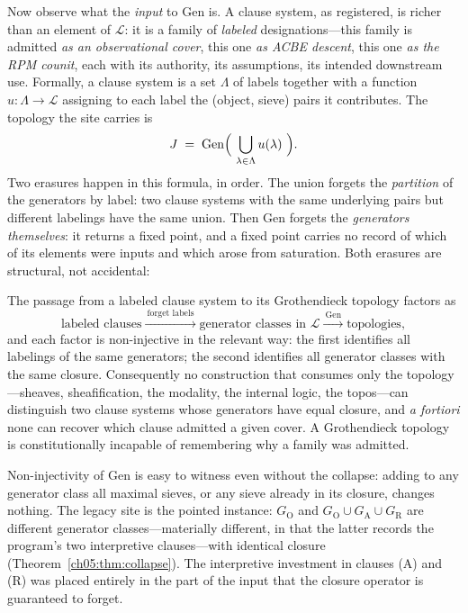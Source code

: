 Now observe what the \emph{input} to $\mathrm{Gen}$ is. A clause system, as
registered, is richer than an element of $\mathcal{L}$: it is a family of
\emph{labeled} designations---this family is admitted \emph{as an
observational cover}, this one \emph{as ACBE descent}, this one \emph{as the
RPM counit}, each with its authority, its assumptions, its intended
downstream use. Formally, a clause system is a set $\Lambda$ of labels
together with a function $u:\Lambda\to\mathcal{L}$ assigning to each label
the (object, sieve) pairs it contributes. The topology the site carries is
\[
J \;=\; \mathrm{Gen}\Bigl(\ \bigcup_{\lambda\in\Lambda}u(\lambda)\ \Bigr).
\]
Two erasures happen in this formula, in order. The union forgets the
\emph{partition} of the generators by label: two clause systems with the same
underlying pairs but different labelings have the same union. Then
$\mathrm{Gen}$ forgets the \emph{generators themselves}: it returns a fixed
point, and a fixed point carries no record of which of its elements were
inputs and which arose from saturation. Both erasures are structural, not
accidental:

\begin{finding}\label{ch05:fnd:erasure}
The passage from a labeled clause system to its Grothendieck topology
factors as
\[
\text{labeled clauses}
\xrightarrow{\ \text{forget labels}\ }
\text{generator classes in }\mathcal{L}
\xrightarrow{\ \mathrm{Gen}\ }
\text{topologies},
\]
and each factor is non-injective in the relevant way: the first identifies
all labelings of the same generators; the second identifies all generator
classes with the same closure. Consequently no construction that consumes
only the topology---sheaves, sheafification, the modality, the internal
logic, the topos---can distinguish two clause systems whose generators have
equal closure, and \emph{a fortiori} none can recover which clause admitted
a given cover. A Grothendieck topology is constitutionally incapable of
remembering why a family was admitted.
\end{finding}

\begin{example}\label{ch05:ex:noninjective}
Non-injectivity of $\mathrm{Gen}$ is easy to witness even without the
collapse: adding to any generator class all maximal sieves, or any sieve
already in its closure, changes nothing. The legacy site is the pointed
instance: $G_{\mathrm{O}}$ and
$G_{\mathrm{O}}\cup G_{\mathrm{A}}\cup G_{\mathrm{R}}$ are different
generator classes---materially different, in that the latter records the
program's two interpretive clauses---with identical closure
(Theorem~\ref{ch05:thm:collapse}). The interpretive investment in clauses
(A) and (R) was placed entirely in the part of the input that the closure
operator is guaranteed to forget.
\end{example}


